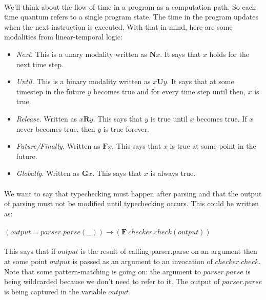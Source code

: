 \documentclass{article}
\begin{document}
\paragraph{}
We'll think about the flow of time in a program as a computation path. So each time quantum refers to a single program state. The time in the program updates when the next instruction is executed. With that in mind, here are some modalities from linear-temporal logic:

\begin{itemize}
	\item \textit{Next.} This is a unary modality written as $\bm{N} x$. It says that $x$ holds for the next time step.
	\item \textit{Until.} This is a binary modality written as $x \bm{U} y$. It says that at some timestep in the future $y$ becomes true and for every time step until then, $x$ is true.
	\item \textit{Release.} Written as $x \bm{R}y$. This says that $y$ is true until $x$ becomes true. If $x$ never becomes true, then $y$ is true forever.
	\item \textit{Future/Finally.} Written as $\bm{F} x$. This says that $x$ is true at some point in the future.
	\item \textit{Globally.} Written as $\bm{G} x$. This says that $x$ is always true.
\end{itemize}

\paragraph{}
We want to say that typechecking must happen after parsing and that the output of parsing must not be modified until typechecking occurs. This could be written as:

\paragraph{}
$(output = parser.parse(\_\_)) \rightarrow (\bm{F}~ checker.check(output))$

\paragraph{}
This says that if $output$ is the result of calling parser.parse on an argument then at some point $output$ is passed as an argument to an invocation of $checker.check$. Note that some pattern-matching is going on: the argument to $parser.parse$ is being wildcarded because we don't need to refer to it. The output of $parser.parse$ is being captured in the variable $output$.
\end{document}
